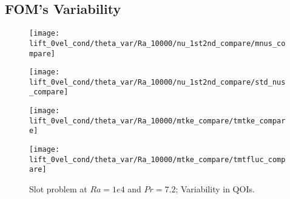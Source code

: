 \subsection{FOM's Variability}
\begin{figure}[h!]
    \begin{minipage}[b]{.25\linewidth}
   \centering 
   \texttt{[image: lift\_0vel\_cond/theta\_var/Ra\_10000/nu\_1st2nd\_compare/mnus\_compare]}
    \end{minipage}%
    \begin{minipage}[b]{.25\linewidth}
   \centering 
   \texttt{[image: lift\_0vel\_cond/theta\_var/Ra\_10000/nu\_1st2nd\_compare/std\_nus\_compare]}
    \end{minipage}%
    \begin{minipage}[b]{.25\linewidth}
   \centering 
   \texttt{[image: lift\_0vel\_cond/theta\_var/Ra\_10000/mtke\_compare/tmtke\_compare]}
    \end{minipage}%
    \begin{minipage}[b]{.25\linewidth}
   \centering 
   \texttt{[image: lift\_0vel\_cond/theta\_var/Ra\_10000/mtke\_compare/tmtfluc\_compare]}
    \end{minipage}%
   \caption{Slot problem at $Ra=1e4$ and $Pr=7.2$; Variability in QOIs.}
\label{fig:slot_pr_7.2_fom_mean} \end{figure}
